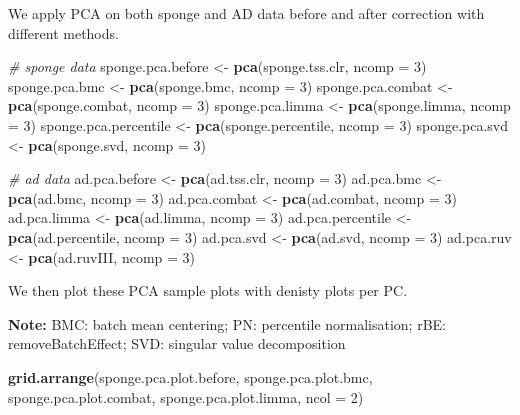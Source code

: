 \documentclass[]{book}
\newenvironment{Shaded}{\begin{snugshade}}{\end{snugshade}}
\newcommand{\KeywordTok}[1]{\textcolor[rgb]{0.13,0.29,0.53}{\textbf{#1}}}
\newcommand{\DataTypeTok}[1]{\textcolor[rgb]{0.13,0.29,0.53}{#1}}
\newcommand{\DecValTok}[1]{\textcolor[rgb]{0.00,0.00,0.81}{#1}}
\newcommand{\StringTok}[1]{\textcolor[rgb]{0.31,0.60,0.02}{#1}}
\newcommand{\CommentTok}[1]{\textcolor[rgb]{0.56,0.35,0.01}{\textit{#1}}}
\newcommand{\NormalTok}[1]{#1}
\begin{document}
We apply PCA on both sponge and AD data before and after correction with
different methods.

\begin{Shaded}
\begin{Highlighting}[]
\CommentTok{# sponge data}
\NormalTok{sponge.pca.before <-}\StringTok{ }\KeywordTok{pca}\NormalTok{(sponge.tss.clr, }\DataTypeTok{ncomp =} \DecValTok{3}\NormalTok{)}
\NormalTok{sponge.pca.bmc <-}\StringTok{ }\KeywordTok{pca}\NormalTok{(sponge.bmc, }\DataTypeTok{ncomp =} \DecValTok{3}\NormalTok{)}
\NormalTok{sponge.pca.combat <-}\StringTok{ }\KeywordTok{pca}\NormalTok{(sponge.combat, }\DataTypeTok{ncomp =} \DecValTok{3}\NormalTok{)}
\NormalTok{sponge.pca.limma <-}\StringTok{ }\KeywordTok{pca}\NormalTok{(sponge.limma, }\DataTypeTok{ncomp =} \DecValTok{3}\NormalTok{)}
\NormalTok{sponge.pca.percentile <-}\StringTok{ }\KeywordTok{pca}\NormalTok{(sponge.percentile, }\DataTypeTok{ncomp =} \DecValTok{3}\NormalTok{)}
\NormalTok{sponge.pca.svd <-}\StringTok{ }\KeywordTok{pca}\NormalTok{(sponge.svd, }\DataTypeTok{ncomp =} \DecValTok{3}\NormalTok{)}

\CommentTok{# ad data}
\NormalTok{ad.pca.before <-}\StringTok{ }\KeywordTok{pca}\NormalTok{(ad.tss.clr, }\DataTypeTok{ncomp =} \DecValTok{3}\NormalTok{)}
\NormalTok{ad.pca.bmc <-}\StringTok{ }\KeywordTok{pca}\NormalTok{(ad.bmc, }\DataTypeTok{ncomp =} \DecValTok{3}\NormalTok{)}
\NormalTok{ad.pca.combat <-}\StringTok{ }\KeywordTok{pca}\NormalTok{(ad.combat, }\DataTypeTok{ncomp =} \DecValTok{3}\NormalTok{)}
\NormalTok{ad.pca.limma <-}\StringTok{ }\KeywordTok{pca}\NormalTok{(ad.limma, }\DataTypeTok{ncomp =} \DecValTok{3}\NormalTok{)}
\NormalTok{ad.pca.percentile <-}\StringTok{ }\KeywordTok{pca}\NormalTok{(ad.percentile, }\DataTypeTok{ncomp =} \DecValTok{3}\NormalTok{)}
\NormalTok{ad.pca.svd <-}\StringTok{ }\KeywordTok{pca}\NormalTok{(ad.svd, }\DataTypeTok{ncomp =} \DecValTok{3}\NormalTok{)}
\NormalTok{ad.pca.ruv <-}\StringTok{ }\KeywordTok{pca}\NormalTok{(ad.ruvIII, }\DataTypeTok{ncomp =} \DecValTok{3}\NormalTok{)}
\end{Highlighting}
\end{Shaded}

We then plot these PCA sample plots with denisty plots per PC.

\textbf{Note:} BMC: batch mean centering; PN: percentile normalisation;
rBE: removeBatchEffect; SVD: singular value decomposition

\begin{Shaded}
\begin{Highlighting}[]
\KeywordTok{grid.arrange}\NormalTok{(sponge.pca.plot.before, sponge.pca.plot.bmc, }
\NormalTok{             sponge.pca.plot.combat, sponge.pca.plot.limma, }\DataTypeTok{ncol =} \DecValTok{2}\NormalTok{)}
\end{Highlighting}
\end{Shaded}
\end{document}
